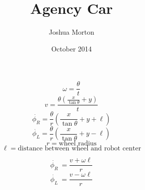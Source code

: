 \documentclass{article}
\title{Agency Car}
\author{Joshua Morton }
\date{October 2014}
\begin{document}
\maketitle
\[\omega = \frac{\theta}{t}\]
\[v = \frac{\theta (\frac{x}{\tan\theta}+y)}{t}\]
\[\dot{\phi_R} = \frac{\theta}{r}(\frac{x}{\tan\theta} + y + \ell)\]
\[\dot{\phi_L} = \frac{\theta}{r}(\frac{x}{\tan\theta} + y - \ell)\]
\[r = \mbox{wheel radius}\]
\[\ell = \mbox{distance between wheel and robot center}\]

\[\dot{\phi_R}\ = \frac{v + \omega\ell}{r}\]
\[\dot{\phi_L}\ = \frac{v - \omega\ell}{r}\]
\end{document}
